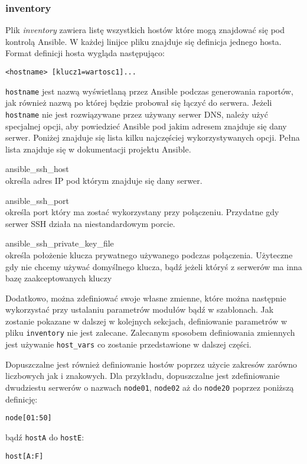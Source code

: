 \subsubsection{inventory}
Plik \textit{inventory} zawiera listę wszystkich hostów które mogą znajdować się pod kontrolą Ansible.  
W każdej linijce pliku znajduje się definicja jednego hosta.
Format definicji hosta wygląda następująco:
\begin{lstlisting}
<hostname> [klucz1=wartosc1]...
\end{lstlisting}
\texttt{hostname} jest nazwą wyświetlaną przez Ansible podczas generowania raportów, jak również nazwą po której będzie probował się łączyć do serwera.
Jeżeli \texttt{hostname} nie jest rozwiązywane przez używany serwer DNS, należy użyć specjalnej opcji, aby powiedzieć Ansible pod jakim adresem znajduje się dany serwer.
Poniżej znajduje się lista kilku najczęściej wykorzystywanych opcji. Pełna lista znajduje się w dokumentacji projektu Ansible.
\begin{description}
\item{ansible\_ssh\_host}\\
	określa adres IP pod którym znajduje się dany serwer.	
\item{ansible\_ssh\_port}\\
	określa port który ma zostać wykorzystany przy połączeniu. Przydatne gdy serwer SSH działa na niestandardowym porcie.
\item{ansible\_ssh\_private\_key\_file}\\
	określa położenie klucza prywatnego używanego podczas połączenia. Użyteczne gdy nie chcemy używać domyślnego klucza, bądź jeżeli któryś z serwerów ma inna bazę zaakceptowanych kluczy
\end{description}
Dodatkowo, można zdefiniować swoje własne zmienne, które można następnie wykorzystać przy ustalaniu parametrów modułów bądź w szablonach.  
Jak zostanie pokazane w dalszej w kolejnych sekcjach, definiowanie parametrów w pliku \texttt{inventory} nie jest zalecane.
Zalecanym sposobem definiowania zmiennych jest używanie \texttt{host\_vars} co zostanie przedstawione w dalszej części.

Dopuszczalne jest również definiowanie hostów poprzez użycie zakresów zarówno liczbowych jak i znakowych.
Dla przykładu, dopuszczalne jest zdefiniowanie dwudziestu serwerów o nazwach \texttt{node01}, \texttt{node02} aż do \texttt{node20} poprzez poniższą definicję:
\begin{lstlisting}
node[01:50]
\end{lstlisting}
bądź \texttt{hostA} do \texttt{hostE}:
\begin{lstlisting}
host[A:F]
\end{lstlisting}

